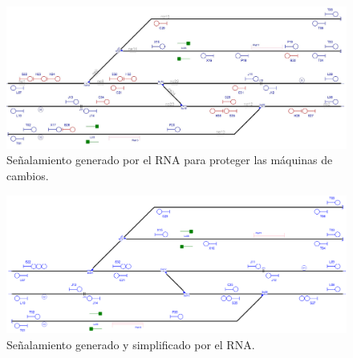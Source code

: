     \begin{figure}[h]
        \centering
        \includegraphics[width=1\textwidth]{resultados-obtenidos/ejemplo1/images/1_step4.png}
        \centering\caption{Señalamiento generado por el RNA para proteger las máquinas de cambios.}
    \end{figure}

    \begin{figure}[h]
        \centering
        \includegraphics[width=1\textwidth]{resultados-obtenidos/ejemplo1/images/1_RNA.png}
        \centering\caption{Señalamiento generado y simplificado por el RNA.}
    \end{figure}
    
    \lipsum[1]    
    
    
    
    
    